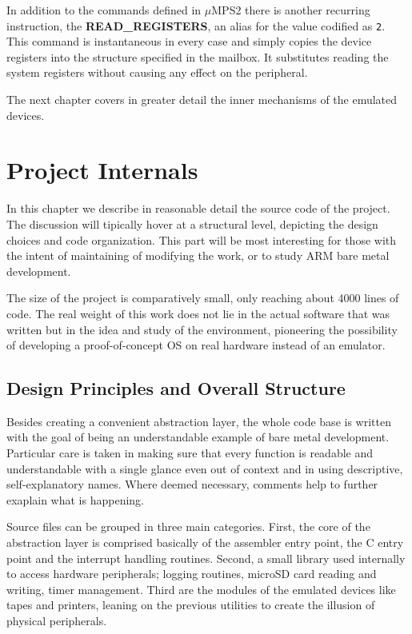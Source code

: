 \documentclass[12pt,a4paper,openright,twoside]{report}
\begin{document}
In addition to the commands defined in $\mu$MPS2 there is another recurring instruction,
the \textbf{READ\_REGISTERS}, an alias for the value codified as {\tt 2}. This
command is instantaneous in every case and simply copies the device registers into
the structure specified in the mailbox. It substitutes reading the system registers
without causing any effect on the peripheral.

The next chapter covers in greater detail the inner mechanisms of the emulated 
devices.

\clearpage{\pagestyle{empty}\cleardoublepage}
\chapter{Project Internals}
In this chapter we describe in reasonable detail the source code of the 
project. The discussion will tipically hover at a structural level, depicting 
the design choices and code organization. This part will be most interesting for
those with the intent of maintaining of modifying the work, or to study ARM
bare metal development.

The size of the project is comparatively small, only reaching about 4000 lines of 
code. The real weight of this work does not lie in the actual software that was
written but in the idea and study of the environment, pioneering the possibility
of developing a proof-of-concept OS on real hardware instead of an emulator.

\section{Design Principles and Overall Structure}
Besides creating a convenient abstraction layer, the whole code base is written 
with the goal of being an understandable example of bare metal development. Particular 
care is taken in making sure that every function is readable and understandable
with a single glance even out of context and in using descriptive, self-explanatory
names. Where deemed necessary, comments help to further exaplain what is happening.

Source files can be grouped in three main categories. First, the core of the abstraction
layer is comprised basically of the assembler entry point, the C entry point and
the interrupt handling routines. Second, a small library used internally to 
access hardware peripherals; logging routines, microSD card reading and writing, 
timer management. Third are the modules of the emulated devices like tapes and
printers, leaning on the previous utilities to create the illusion of physical
peripherals.
\end{document}
